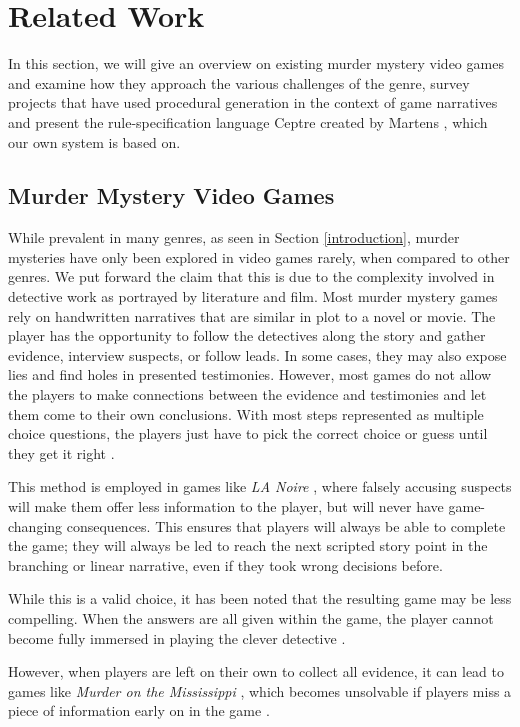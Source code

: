 \section{Related Work} \label{related_work}

In this section, we will give an overview on existing murder mystery video games and examine how they approach the various challenges of the genre, survey projects that have used procedural generation in the context of game narratives and present the rule-specification language Ceptre created by Martens \cite{martens_2015}, which our own system is based on.

\subsection{Murder Mystery Video Games}

While prevalent in many genres, as seen in Section \ref{introduction}, murder mysteries have only been explored in video games rarely, when compared to other genres.
We put forward the claim that this is due to the complexity involved in detective work as portrayed by literature and film.
Most murder mystery games rely on handwritten narratives that are similar in plot to a novel or movie.
The player has the opportunity to follow the detectives along the story and gather evidence, interview suspects, or follow leads.
In some cases, they may also expose lies and find holes in presented testimonies.
However, most games do not allow the players to make connections between the evidence and testimonies and let them come to their own conclusions. With most steps represented as multiple choice questions, the players just have to pick the correct choice or guess until they get it right \cite{brown_2017}.

This method is employed in games like \emph{LA Noire} \cite{game:la_noire}, where falsely accusing suspects will make them offer less information to the player, but will never have game-changing consequences.
This ensures that players will always be able to complete the game; they will always be led to reach the next scripted story point in the branching or linear narrative, even if they took wrong decisions before.

While this is a valid choice, it has been noted that the resulting game may be less compelling.
When the answers are all given within the game, the player cannot become fully immersed in playing the clever detective \cite{goldstein_2018}.

However, when players are left on their own to collect all evidence, it can lead to games like \emph{Murder on the Mississippi} \cite{game:murder_mississippi}, which becomes unsolvable if players miss a piece of information early on in the game \cite{petit_2018}.

